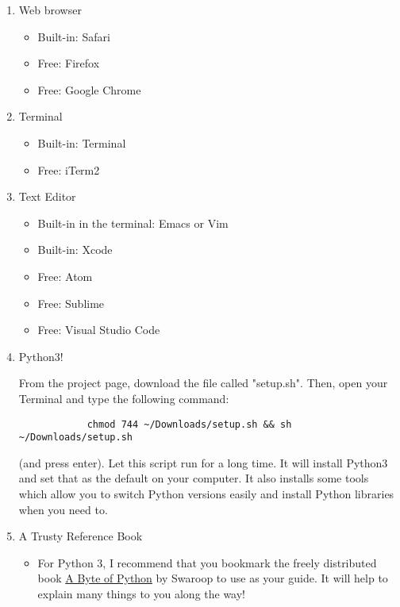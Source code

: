 \documentclass{42-en}
\begin{document}
\begin{enumerate}
	\item Web browser
	\begin{itemize}
		\item Built-in: Safari
		\item Free: Firefox
		\item Free: Google Chrome
	\end{itemize}
	\item Terminal
	\begin{itemize}
		\item Built-in: Terminal
		\item Free: iTerm2
	\end{itemize}
	\item Text Editor
	\begin{itemize}
		\item Built-in in the terminal: Emacs or Vim
		\item Built-in: Xcode
		\item Free: Atom
		\item Free: Sublime
		\item Free: Visual Studio Code
	\end{itemize}
	\newpage
	\item Python3!

		From the project page, download the file called "setup.sh".
		Then, open your Terminal and type the following command:

		\begin{verbatim}
			chmod 744 ~/Downloads/setup.sh && sh ~/Downloads/setup.sh 
		\end{verbatim}
		(and press enter).
		Let this script run for a long time. It will install Python3 and set that as the default on your computer. It also installs some tools which allow you to switch Python versions easily and install Python libraries when you need to.

	\item A Trusty Reference Book
	\begin{itemize}
		\item For Python 3, I recommend that you bookmark the freely distributed book \href{https://python.swaroopch.com/}{A Byte of Python} by Swaroop to use as your guide. It will help to explain many things to you along the way!
	\end{itemize}
\end{enumerate}

\end{document}
